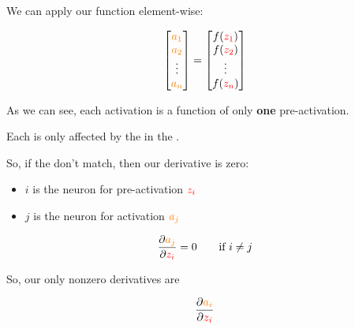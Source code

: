         We can apply our function element-wise:
        
        \begin{equation}
            \begin{bmatrix}
                \textcolor{orange}{a_1}\\ \textcolor{orange}{a_2}\\ \vdots \\ \textcolor{orange}{a_n}
            \end{bmatrix}
            =
            \begin{bmatrix}
                f(\textcolor{red}{z_1})\\ f(\textcolor{red}{z_2}) \\ \vdots \\ f(\textcolor{red}{z_n})
            \end{bmatrix}
        \end{equation}
        
        As we can see, each activation is a function of only \textbf{one} pre-activation.\\
        
        \begin{concept}
            Each  is only affected by the  in the . 
            
            So, if the  don't match, then our derivative is zero:
            
            \begin{itemize}
                \item $i$ is the neuron for pre-activation $\textcolor{red}{z_i}$
                \item $j$ is the neuron for activation $\textcolor{orange}{a_j}$
            \end{itemize}
            
            \begin{equation*}
                \frac{\partial  \textcolor{orange}{a_j} }{\partial  \textcolor{red}{z_i} } = 0
                \qquad
                \text{if } i \neq j
            \end{equation*}
            
            So, our only nonzero derivatives are
            
            \begin{equation*}
                \frac{\partial  \textcolor{orange}{a_i} }{\partial  \textcolor{red}{z_i} }
            \end{equation*}
            
        \end{concept}
        
